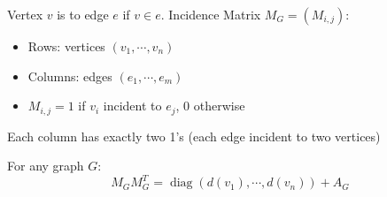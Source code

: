 \documentclass[8pt,a4paper,landscape]{extarticle}
\begin{document}
\begin{cscolumns}
\begin{definition}
Vertex $v$ is  to edge $e$ if $v\in e$. Incidence Matrix $M_G=(M_{i,j})$:
\begin{itemize}
\item Rows: vertices $(v_1,\cdots,v_n)$
\item Columns: edges $(e_1,\cdots,e_m)$
\item $M_{i,j}=1$ if $v_i$ incident to $e_j$, 0 otherwise
\end{itemize}
\end{definition}
\begin{theorem}[Property of $M_G$]
Each column has exactly two 1's (each edge incident to two vertices)
\end{theorem}

\begin{theorem}
For any graph $G$:
\[ M_GM_G^{T}=\operatorname{diag}(d(v_1),\cdots,d(v_n))+A_G \]
\end{theorem}

\end{cscolumns}
\newpage
\end{document}

